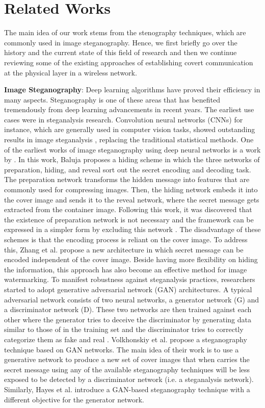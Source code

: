 \section{Related Works}
\label{s:related}
The main idea of our work stems from the stenography techniques, which are commonly used in image steganography. Hence, we first briefly go over the history and the current state of this field of research and then we continue reviewing some of the existing approaches of establishing covert communication at the physical layer in a wireless network.


\textbf{Image Steganography}: Deep learning algorithms have proved their efficiency in many aspects. Steganography is one of these areas that has benefited tremendously from deep learning advancements in recent years. The earliest use cases were in steganalysis research. Convolution neural networks (CNNs) for instance, which are generally used in computer vision tasks, showed outstanding results in image steganalysis \cite{tan2014stacked,qian2015deep,xu2016structural}, replacing the traditional statistical methods. One of the earliest works of image steganography using deep neural networks is a work by \cite{baluja2017hiding}. In this work, Baluja proposes a hiding scheme in which the three networks of preparation, hiding, and reveal sort out the secret encoding and decoding task. The preparation network transforms the hidden message into features that are commonly used for compressing images. Then, the hiding network embeds it into the cover image and sends it to the reveal network, where the secret message gets extracted from the container image. Following this work, it was discovered that the existence of preparation network is not necessary and the framework can be expressed in a simpler form by excluding this network \cite{zhang2021brief}. The disadvantage of these schemes is that the encoding process is reliant on the cover image. To address this, Zhang et al. \cite{zhang2020udh} propose a new architecture in which secret message can be encoded independent of the cover image. Beside having more flexibility on hiding the information, this approach has also become an effective method for image watermarking. To manifest robustness against steganalysis practices, researchers started to adopt generative adversarial network (GAN) architectures. A typical adversarial network consists of two neural networks, a generator network (G) and a discriminator network (D). These two networks are then trained against each other where the generator tries to deceive the discriminator by generating data similar to those of in the training set and the discriminator tries to correctly categorize them as fake and real \cite{goodfellow2014generative}. Volkhonskiy et al. \cite{volkhonskiy2020steganographic} propose a steganography technique based on GAN networks. The main idea of their work is to use a generative network to produce a new set of cover images that when carries the secret message using any of the available steganography techniques will be less exposed to be detected by a discriminator network (i.e. a steganalysis network). Similarly, Hayes et al. \cite{hayes2017generating} introduce a GAN-based steganography technique with a different objective for the generator network. 